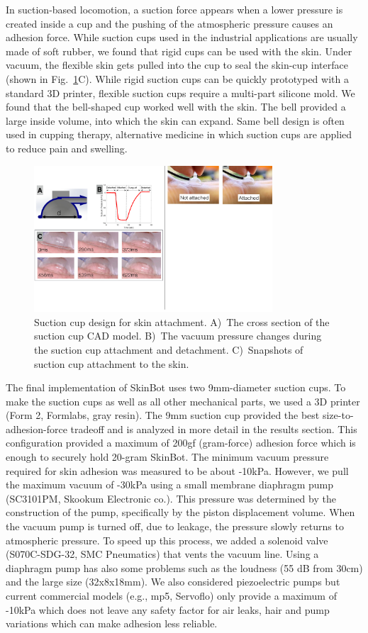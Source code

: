 In suction-based locomotion, a suction force appears when a lower pressure is created inside a cup and the pushing of the atmospheric pressure causes an adhesion force. While suction cups used in the industrial applications are usually made of soft rubber, we found that rigid cups can be used with the skin. Under vacuum, the flexible skin gets pulled into the cup to seal the skin-cup interface (shown in Fig.~\ref{fig:suction_cup_design}C). While rigid suction cups can be quickly prototyped with a standard 3D printer, flexible suction cups require a multi-part silicone mold. We found that the bell-shaped cup worked well with the skin. The bell provided a large inside volume, into which the skin can expand. Same bell design is often used in cupping therapy, alternative medicine in which suction cups are applied to reduce pain and swelling.   

\begin{figure}[!ht]
\centering
\includegraphics[width=8.9cm]{pictures/chapter3/suction_cup_design_small.pdf}
\caption{Suction cup design for skin attachment. A)~The cross section of the suction cup CAD model. B)~The vacuum pressure changes during the suction cup attachment and detachment. C)~Snapshots of suction cup attachment to the skin. }
\label{fig:suction_cup_design}
\end{figure}

The final implementation of SkinBot uses two 9mm-diameter suction cups. To make the suction cups as well as all other mechanical parts, we used a 3D printer (Form 2, Formlabs, gray resin). The 9mm suction cup provided the best size-to-adhesion-force tradeoff and is analyzed in more detail in the results section. This configuration provided a maximum of 200gf (gram-force) adhesion force which is enough to securely hold 20-gram SkinBot. The minimum vacuum pressure required for skin adhesion was measured to be about -10kPa. However, we pull the maximum vacuum of -30kPa using a small membrane diaphragm pump (SC3101PM, Skookum Electronic co.). This pressure was determined by the construction of the pump, specifically by the piston displacement volume. When the vacuum pump is turned off, due to leakage, the pressure slowly returns to atmospheric pressure. To speed up this process, we added a solenoid valve (S070C-SDG-32, SMC Pneumatics) that vents the vacuum line. Using a diaphragm pump has also some problems such as the loudness (55 dB from 30cm) and the large size (32x8x18mm). We also considered piezoelectric pumps but current commercial models (e.g., mp5, Servoflo) only provide a maximum of -10kPa which does not leave any safety factor for air leaks, hair and pump variations which can make adhesion less reliable. 


